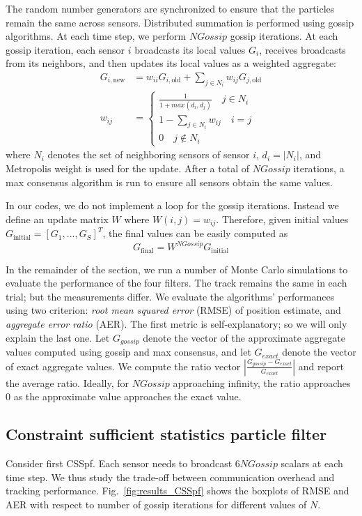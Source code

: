 \documentclass[10pt,letterpaper,final]{article}
\begin{document}
The random number generators are synchronized to ensure that the particles remain the same across sensors. Distributed summation is performed using gossip algorithms. At each time step, we perform $NGossip$ gossip iterations. At each gossip iteration, each sensor $i$ broadcasts its local values $G_i$, receives broadcasts from its neighbors, and then updates its local values as a weighted aggregate:
\begin{align}
G_{i,\text{new}} &= w_{ii}G_{i,\text{old}} + \sum_{j\in N_i}w_{ij}G_{j,\text{old}} \\
w_{ij} &=
\begin{cases}
\frac{1}{1+max(d_i, d_j)} \quad j\in N_i \\
1-\sum_{j\in N_i}w_{ij} \quad i=j \\
0 \quad j\notin N_i
\end{cases}
\label{eqn:metropolis_weight}
\end{align}
where $N_i$ denotes the set of neighboring sensors of sensor $i$, $d_i=|N_i|$, and Metropolis weight is used for the update. After a total of $NGossip$ iterations, a max consensus algorithm is run to ensure all sensors obtain the same values. 

In our codes, we do not implement a loop for the gossip iterations. Instead we define an update matrix $W$ where $W(i,j)=w_{ij}$. Therefore, given initial values $G_{\text{initial}}=[G_1,...,G_S]^T$, the final values can be easily computed as 
\begin{equation}
G_{\text{final}} = W^{NGossip}G_{\text{initial}}
\end{equation}

In the remainder of the section, we run a number of Monte Carlo simulations to evaluate the performance of the four filters. The track remains the same in each trial; but the measurements differ. We evaluate the algorithms' performances using two criterion: \textit{root mean squared error} (RMSE) of position estimate, and \textit{aggregate error ratio} (AER). The first metric is self-explanatory; so we will only explain the last one. Let $G_{gossip}$ denote the vector of the approximate aggregate values computed using gossip and max consensus, and let $G_{exact}$ denote the vector of exact aggregate values. We compute the ratio vector $|\frac{G_{gossip}-G_{exact}}{G_{exact}}|$ and report the average ratio. Ideally, for $NGossip$ approaching infinity, the ratio approaches 0 as the approximate value approaches the exact value. 

\subsection{Constraint sufficient statistics particle filter}
Consider first CSSpf. Each sensor needs to broadcast $6NGossip$ scalars at each time step. We thus study the trade-off between communication overhead and tracking performance. Fig.~\ref{fig:results_CSSpf} shows the boxplots of RMSE and AER with respect to number of gossip iterations for different values of $N$. %
\end{document}
